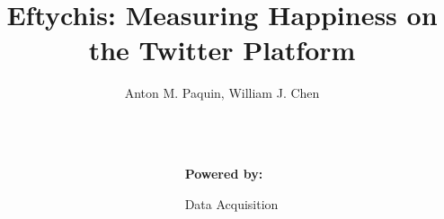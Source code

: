 \documentclass[final]{beamer}
\title{Eftychis: Measuring Happiness on the Twitter Platform} %
\author{Anton M. Paquin, William J. Chen} %
\institute{\{paquin,chenwill\}@bu.edu} %
\newlength{\sepwid}
\newlength{\onecolwid}
\begin{document}

\setlength{\belowcaptionskip}{2ex} %
\setlength\belowdisplayshortskip{2ex} %

\begin{frame}[t] %

\begin{columns}[t] %

\begin{column}{\sepwid}\end{column} %

\begin{column}{\onecolwid} %



\begin{block}{\textbf{Powered by:}}



\end{block}


\begin{block}{Data Acquisition}


\end{block}
\end{column}
\end{columns}
\end{frame}
\end{document}
